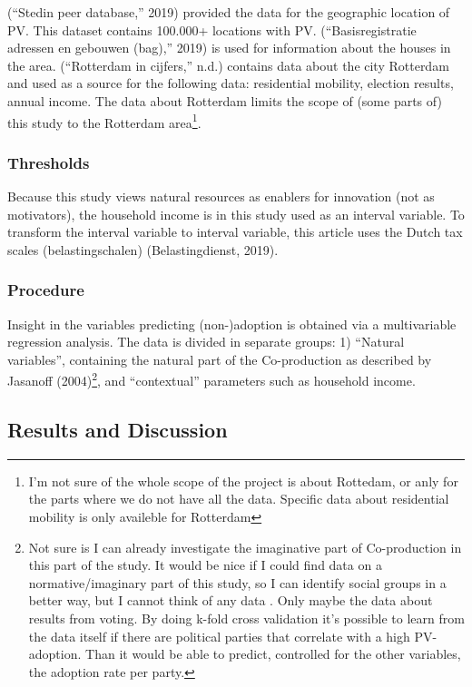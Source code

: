 \documentclass[man,floatsintext]{apa6}
\let\rmarkdownfootnote\footnote%
\def\footnote{\protect\rmarkdownfootnote}
\begin{document}
(``Stedin peer database,'' 2019) provided the data for the geographic
location of PV. This dataset contains 100.000+ locations with PV.
(``Basisregistratie adressen en gebouwen (bag),'' 2019) is used for
information about the houses in the area. (``Rotterdam in cijfers,''
n.d.) contains data about the city Rotterdam and used as a source for
the following data: residential mobility, election results, annual
income. The data about Rotterdam limits the scope of (some parts of)
this study to the Rotterdam area\footnote{I'm not sure of the whole
  scope of the project is about Rottedam, or anly for the parts where we
  do not have all the data. Specific data about residential mobility is
  only availeble for Rotterdam}.

\subsubsection{Thresholds}\label{thresholds}

Because this study views natural resources as enablers for innovation
(not as motivators), the household income is in this study used as an
interval variable. To transform the interval variable to interval
variable, this article uses the Dutch tax scales (belastingschalen)
(Belastingdienst, 2019).

\subsubsection{Procedure}\label{procedure}

Insight in the variables predicting (non-)adoption is obtained via a
multivariable regression analysis. The data is divided in separate
groups: 1) \enquote{Natural variables}, containing the natural part of
the Co-production as described by Jasanoff (2004)\footnote{Not sure is I
  can already investigate the imaginative part of Co-production in this
  part of the study. It would be nice if I could find data on a
  normative/imaginary part of this study, so I can identify social
  groups in a better way, but I cannot think of any data . Only maybe
  the data about results from voting. By doing k-fold cross validation
  it's possible to learn from the data itself if there are political
  parties that correlate with a high PV-adoption. Than it would be able
  to predict, controlled for the other variables, the adoption rate per
  party.}, and \enquote{contextual} parameters such as household income.

\subsection{Results and Discussion}\label{results-and-discussion}
\end{document}
